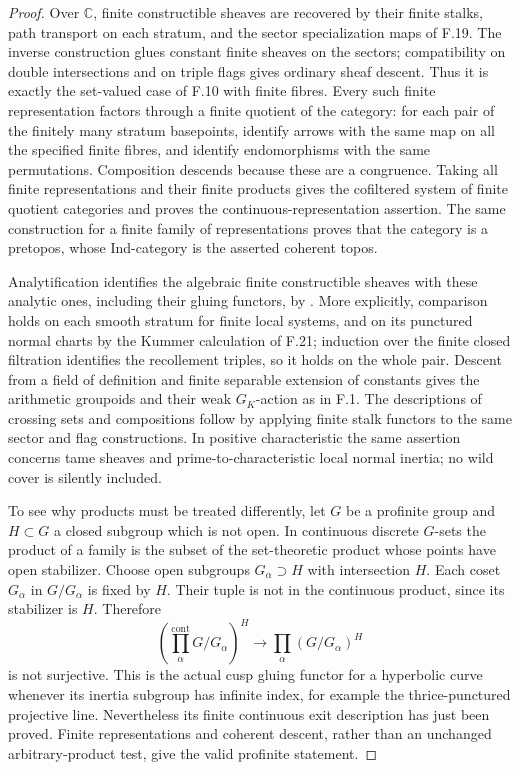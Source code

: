 \begin{proof}
Over $\mathbb C$, finite constructible sheaves are recovered by their
finite stalks, path transport on each stratum, and the sector
specialization maps of F.19. The inverse construction glues constant
finite sheaves on the sectors; compatibility on double intersections
and on triple flags gives ordinary sheaf descent. Thus it is exactly
the set-valued case of F.10 with finite fibres. Every such finite
representation factors through a finite quotient of the category:
for each pair of the finitely many stratum basepoints, identify arrows
with the same map on all the specified finite fibres, and identify
endomorphisms with the same permutations. Composition descends because
these are a congruence. Taking all finite representations and their
finite products gives the cofiltered system of finite quotient
categories and proves the continuous-representation assertion.
The same construction for a finite family of representations proves
that the category is a pretopos, whose Ind-category is the asserted
coherent topos.

Analytification identifies the algebraic finite constructible sheaves
with these analytic ones, including their gluing functors, by
\cite[Proposition~12.6.4 and Corollary~12.6.7]{BGH2020}. More
explicitly, comparison holds on each smooth stratum for finite local
systems, and on its punctured normal charts by the Kummer calculation
of F.21; induction over the finite closed filtration identifies the
recollement triples, so it holds on the whole pair. Descent from a
field of definition and finite separable extension of constants gives
the arithmetic groupoids and their weak $G_K$-action as in F.1.
The descriptions of crossing sets and compositions follow by applying
finite stalk functors to the same sector and flag constructions.
In positive characteristic the same assertion concerns tame sheaves
and prime-to-characteristic local normal inertia; no wild cover is
silently included.

To see why products must be treated differently, let $G$ be a
profinite group and $H\subset G$ a closed subgroup which is not open.
In continuous discrete $G$-sets the product of a family is the subset
of the set-theoretic product whose points have open stabilizer. Choose
open subgroups $G_\alpha\supset H$ with intersection $H$. Each coset
$G_\alpha$ in $G/G_\alpha$ is fixed by $H$. Their tuple is not in the
continuous product, since its stabilizer is $H$. Therefore
\[
 \left(\prod_{\alpha}^{\mathrm{cont}}G/G_\alpha\right)^H
 \longrightarrow\prod_\alpha(G/G_\alpha)^H
\]
is not surjective. This is the actual cusp gluing functor for a
hyperbolic curve whenever its inertia subgroup has infinite index,
for example the thrice-punctured projective line. Nevertheless its
finite continuous exit description has just been proved. Finite
representations and coherent descent, rather than an unchanged
arbitrary-product test, give the valid profinite statement.
\end{proof}


